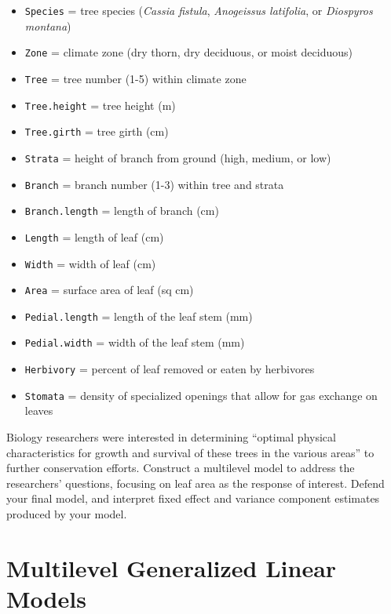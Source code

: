 \documentclass[
]{krantz}
\providecommand{\tightlist}{%
  \setlength{\itemsep}{0pt}\setlength{\parskip}{0pt}}
\begin{document}
\begin{enumerate}
  \begin{itemize}
  \tightlist
  \item
    \texttt{Species} = tree species (\emph{Cassia fistula}, \emph{Anogeissus latifolia}, or \emph{Diospyros montana})
  \item
    \texttt{Zone} = climate zone (dry thorn, dry deciduous, or moist deciduous)
  \item
    \texttt{Tree} = tree number (1-5) within climate zone
  \item
    \texttt{Tree.height} = tree height (m)
  \item
    \texttt{Tree.girth} = tree girth (cm)
  \item
    \texttt{Strata} = height of branch from ground (high, medium, or low)
  \item
    \texttt{Branch} = branch number (1-3) within tree and strata
  \item
    \texttt{Branch.length} = length of branch (cm)
  \item
    \texttt{Length} = length of leaf (cm)
  \item
    \texttt{Width} = width of leaf (cm)
  \item
    \texttt{Area} = surface area of leaf (sq cm)
  \item
    \texttt{Pedial.length} = length of the leaf stem (mm)
  \item
    \texttt{Pedial.width} = width of the leaf stem (mm)
  \item
    \texttt{Herbivory} = percent of leaf removed or eaten by herbivores
  \item
    \texttt{Stomata} = density of specialized openings that allow for gas exchange on leaves
  \end{itemize}

  Biology researchers were interested in determining ``optimal physical characteristics for growth and survival of these trees in the various areas'' to further conservation efforts. Construct a multilevel model to address the researchers' questions, focusing on leaf area as the response of interest. Defend your final model, and interpret fixed effect and variance component estimates produced by your model.
\end{enumerate}

\hypertarget{ch-GLMM}{%
\chapter{Multilevel Generalized Linear Models}\label{ch-GLMM}}
\end{document}
